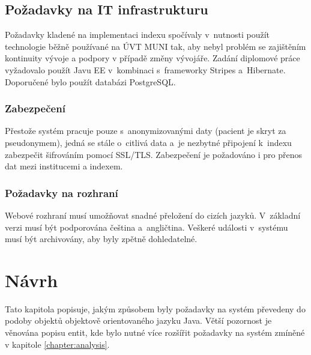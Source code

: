 \documentclass[11pt,draft,oneside]{fithesis2}
\begin{document}
\section{Požadavky na IT infrastrukturu}
Požadavky kladené na implementaci indexu spočívaly v~nutnosti použít technologie běžně používané na ÚVT MUNI tak, aby nebyl problém se zajištěním kontinuity vývoje a podpory v případě změny vývojáře. Zadání diplomové práce vyžadovalo použít Javu EE v~kombinaci s~frameworky Stripes a~Hibernate. Doporučené bylo použít databázi PostgreSQL.

\subsection{Zabezpečení}
Přestože systém pracuje pouze s~anonymizovanými daty (pacient je skryt za pseudonymem), jedná se stále o~citlivá data a~je nezbytné připojení k~indexu zabezpečit šifrováním pomocí SSL/TLS.
Zabezpečení je požadováno i pro přenos dat mezi institucemi a indexem.	

\subsection{Požadavky na rozhraní}
Webové rozhraní musí umožňovat snadné přeložení do cizích jazyků. V~základní verzi musí být podporována čeština a~angličtina. 
Veškeré události v~systému musí být archivovány, aby byly zpětně dohledatelné.










\chapter{Návrh}\label{chapter:proposal}
Tato kapitola popisuje, jakým způsobem byly požadavky na systém převedeny do podoby objektů objektově orientovaného jazyku Java. Větší pozornost je věnována popisu entit, kde bylo nutné více rozšířit požadavky na systém zmíněné v kapitole \ref{chapter:analysis}.
\end{document}
